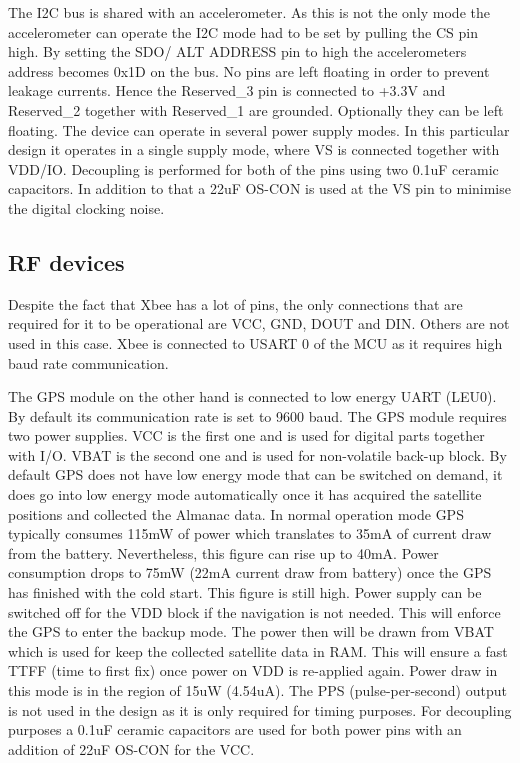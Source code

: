 The I2C bus is shared with an accelerometer. As this is not the only mode the accelerometer can operate the I2C mode had to be set by pulling the CS pin high. By setting the SDO/ ALT ADDRESS pin to high the accelerometers address becomes 0x1D on the bus. No pins are left floating in order to prevent leakage currents. Hence the Reserved\_3 pin is connected to +3.3V and Reserved\_2 together with Reserved\_1 are grounded. Optionally they can be left floating. 
The device can operate in several power supply modes. In this particular design it operates in a single supply mode, where VS is connected together with VDD/IO. Decoupling is performed for both of the pins using two 0.1uF ceramic capacitors. In addition to that a 22uF OS-CON is used at the VS pin to minimise the digital clocking noise.

\subsection{RF devices}
\label{sec:pcb_gps}
Despite the fact that Xbee has a lot of pins, the only connections that are required for it to be operational are VCC, GND, DOUT and DIN. Others are not used in this case. Xbee is connected to USART 0 of the MCU as it requires high baud rate communication.

The GPS module on the other hand is connected to low energy UART (LEU0). By default its communication rate is set to 9600 baud. The GPS module requires two power supplies. VCC is the first one and is used for digital parts together with I/O. VBAT is the second one and is used for non-volatile back-up block. By default GPS does not have low energy mode that can be switched on demand, it does go into low energy mode automatically once it has acquired the satellite positions and collected the Almanac data. In normal operation mode GPS typically consumes 115mW of power which translates to 35mA of current draw from the battery. Nevertheless, this figure can rise up to 40mA. Power consumption drops to 75mW (22mA current draw from battery) once the GPS has finished with the cold start. This figure is still high. Power supply can be switched off for the VDD block if the navigation is not needed. This will enforce the GPS to enter the backup mode. The power then will be drawn from VBAT which is used for keep the collected satellite data in RAM. This will ensure a fast TTFF (time to first fix) once power on VDD is re-applied again. Power draw in this mode is in the region of 15uW (4.54uA).
The PPS (pulse-per-second) output is not used in the design as it is only required for timing purposes. For decoupling purposes a 0.1uF ceramic capacitors are used for both power pins with an addition of 22uF OS-CON for the VCC.

